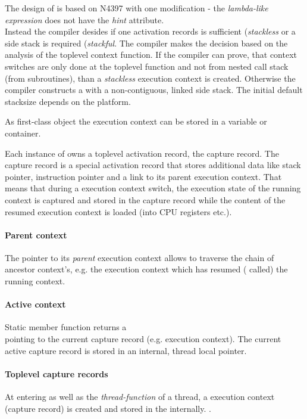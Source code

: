 The design of \ectx is based on N4397\cite{N4397} with one modification - the
\emph{lambda-like expression} does not have the \emph{hint} attribute.\\
Instead the compiler desides if one activation records is sufficient
(\emph{stackless} or a side stack is required (\emph{stackful}. The compiler 
makes the decision based on the analysis of the toplevel context function.
If the compiler can prove, that context switches are only done at the toplevel
function and not from nested call stack (from subroutines), than a
\emph{stackless} execution context is created. Otherwise the compiler constructs
a \ectx with a non-contiguous, linked side stack. The initial default stacksize
depends on the platform.

As first-class object the execution context can be stored in a variable or
container.

Each instance of \ectx owns a toplevel activation record, the capture record.
The capture record is a special activation record that stores additional data
like stack pointer, instruction pointer and a link to its parent execution
context. That means that during a execution context switch, the execution state
of the running context is captured and stored in the capture record while the
content of the resumed execution context is loaded (into CPU registers etc.).

\paragraph*{Parent context}
The pointer to its \emph{parent} execution context allows to traverse the chain
of ancestor context's, e.g. the execution context which has resumed (\ectxop
called) the running context.

\paragraph*{Active context}
Static member function \ectxcurrent returns a\\
\ectx pointing to the current capture record (e.g. execution context). The
current active capture record is stored in an internal, thread local pointer.

\paragraph*{Toplevel capture records}
At entering \main as well as the \emph{thread-function} of a thread, a execution
context (capture record) is created and stored in the internally.
\ectxcurrent.

